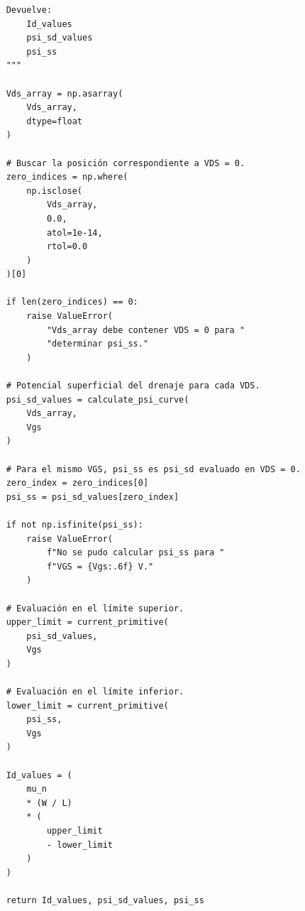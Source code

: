 \documentclass[a4paper, twoside, 10pt, spanish]{article}
\numberwithin{table}{section}
\begin{document}
\begin{verbatim}
    Devuelve:
        Id_values
        psi_sd_values
        psi_ss
    """

    Vds_array = np.asarray(
        Vds_array,
        dtype=float
    )

    # Buscar la posición correspondiente a VDS = 0.
    zero_indices = np.where(
        np.isclose(
            Vds_array,
            0.0,
            atol=1e-14,
            rtol=0.0
        )
    )[0]

    if len(zero_indices) == 0:
        raise ValueError(
            "Vds_array debe contener VDS = 0 para "
            "determinar psi_ss."
        )

    # Potencial superficial del drenaje para cada VDS.
    psi_sd_values = calculate_psi_curve(
        Vds_array,
        Vgs
    )

    # Para el mismo VGS, psi_ss es psi_sd evaluado en VDS = 0.
    zero_index = zero_indices[0]
    psi_ss = psi_sd_values[zero_index]

    if not np.isfinite(psi_ss):
        raise ValueError(
            f"No se pudo calcular psi_ss para "
            f"VGS = {Vgs:.6f} V."
        )

    # Evaluación en el límite superior.
    upper_limit = current_primitive(
        psi_sd_values,
        Vgs
    )

    # Evaluación en el límite inferior.
    lower_limit = current_primitive(
        psi_ss,
        Vgs
    )

    Id_values = (
        mu_n
        * (W / L)
        * (
            upper_limit
            - lower_limit
        )
    )

    return Id_values, psi_sd_values, psi_ss
\end{verbatim}
\end{document}
